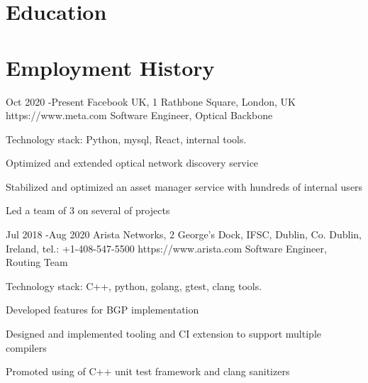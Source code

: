 \documentclass[9pt]{article} %
\begin{document}
\section{Education}

\vspace{-1mm}


\section{Employment History}

\job
{Oct 2020 -}{Present}
{Facebook UK, 1 Rathbone Square, London, UK}
{https://www.meta.com}
{Software Engineer, Optical Backbone}
{
Technology stack: Python, mysql, React, internal tools.
\begin{itemize-noindent}
\setlength\itemsep{-0.5em}
\item{Optimized and extended optical network discovery service}
\item{Stabilized and optimized an asset manager service with hundreds of internal users}
\item{Led a team of 3 on several of projects}
\end{itemize-noindent}
}

\job
{Jul 2018 -}{Aug 2020}
{Arista Networks, 2 George's Dock, IFSC, Dublin, Co. Dublin, Ireland, tel.: +1-408-547-5500}
{https://www.arista.com}
{Software Engineer, Routing Team}
{
Technology stack: C++, python, golang, gtest, clang tools.
\begin{itemize-noindent}
\setlength\itemsep{-0.5em}
\item{Developed features for BGP implementation}
\item{Designed and implemented tooling and CI extension to support multiple compilers}
\item{Promoted using of C++ unit test framework and clang sanitizers}
\end{itemize-noindent}
}
\end{document}

